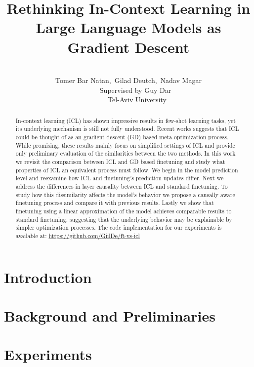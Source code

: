 \documentclass[11pt]{article}
\title{Rethinking In-Context Learning in Large Language Models as Gradient Descent}
\author{\\
Tomer Bar Natan,~Gilad Deutch,~Nadav Magar\\
~~~~Supervised by Guy Dar\\
~~~~~Tel-Aviv University}
\date{}
\begin{document}
\maketitle

\begin{abstract}
	In-context learning (ICL) has shown impressive results in few-shot learning tasks, yet its underlying mechanism is still not fully understood.
	Recent works suggests that ICL could be thought of as an gradient descent (GD) based meta-optimization process.
	While promising, these results mainly focus on simplified settings of ICL and provide only preliminary evaluation of the similarities between the two methods. 
	In this work we revisit the comparison between ICL and GD based finetuning and study what properties of ICL an equivalent process must follow. 
	We begin in the model prediction level and reexamine how ICL and finetuning's prediction updates differ.
	Next we address the differences in layer causality between ICL and standard finetuning.
	To study how this dissimilarity affects the model's behavior we propose a causally aware finetuning process and compare it with previous results. 
	Lastly we show that finetuning using a linear approximation of the model achieves comparable results to standard finetuning,
	suggesting that the underlying behavior may be explainable by simpler optimization processes.
	The code implementation for our experiments is available at:
	\href{https://github.com/GiilDe/ft-vs-icl}{https://github.com/GiilDe/ft-vs-icl}
\end{abstract}

\section{Introduction}


\section{Background and Preliminaries}



\section{Experiments}

\end{document}
